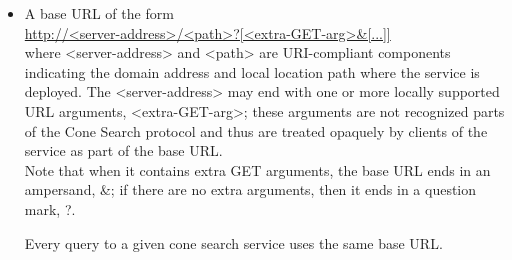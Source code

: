 \documentclass[11pt,a4paper]{ivoa}
\begin{document}
	\begin{itemize}
		\item A base URL of the form\\
		
		\url{http://<server-address>/<path>?[<extra-GET-arg>&[...]]}\\
		
			where <server-address> and <path> are URI-compliant components
			indicating the domain address and local location path where the service
			is deployed. The <server-address> may end with one or more locally
			supported URL arguments, <extra-GET-arg>; these arguments are not
			recognized parts of the Cone Search protocol and thus are treated
			opaquely by clients of the service as part of the base URL.\\ Note that
			when it contains extra GET arguments, the base URL ends in an ampersand,
			\&; if there are no extra arguments, then it ends in a question mark,
			?.\\ 
		
		
		Every query to a given cone search service uses the same base URL.
		

\end{itemize}
\end{document}
